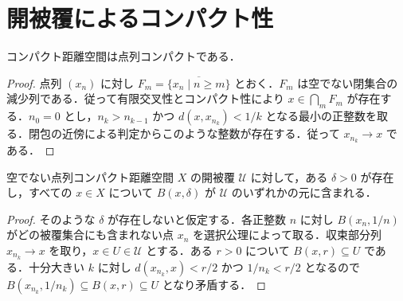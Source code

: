 \section{開被覆によるコンパクト性}
\begin{prop}[コンパクト空間の点列コンパクト性]
コンパクト距離空間は点列コンパクトである．
\end{prop}
\begin{proof}
点列 $(x_n)$ に対し $F_m=\overline{\{x_n\mid n\geq m\}}$ とおく．$F_m$ は空でない閉集合の減少列である．従って有限交叉性とコンパクト性により $x\in\bigcap_m F_m$ が存在する．$n_0=0$ とし，$n_k>n_{k-1}$ かつ $d(x,x_{n_k})<1/k$ となる最小の正整数を取る．閉包の近傍による判定からこのような整数が存在する．従って $x_{n_k}\to x$ である．
\end{proof}
\begin{prop}[開被覆のLebesgue数]
空でない点列コンパクト距離空間 $X$ の開被覆 $\mathcal U$ に対して，ある $\delta>0$ が存在し，すべての $x\in X$ について $B(x,\delta)$ が $\mathcal U$ のいずれかの元に含まれる．
\end{prop}
\begin{proof}
そのような $\delta$ が存在しないと仮定する．各正整数 $n$ に対し $B(x_n,1/n)$ がどの被覆集合にも含まれない点 $x_n$ を選択公理によって取る．収束部分列 $x_{n_k}\to x$ を取り，$x\in U\in\mathcal U$ とする．ある $r>0$ について $B(x,r)\subseteq U$ である．十分大きい $k$ に対し $d(x_{n_k},x)<r/2$ かつ $1/n_k<r/2$ となるので $B(x_{n_k},1/n_k)\subseteq B(x,r)\subseteq U$ となり矛盾する．
\end{proof}

